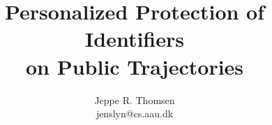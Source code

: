 \documentclass[t,mathserif]{beamer}
\title[DAT7\hspace{21em}\insertframenumber/\inserttotalframenumber]{Personalized Protection of Identifiers\\on Public Trajectories}
\author[Jeppe]{Jeppe R. Thomsen \\ \small{jenslyn@cs.aau.dk}}
\institute{Aalborg University\\ Department of Computer Science}
\begin{document}
\begin{frame} %
\titlepage
\end{frame}

%
%
%

%
%

%
%

%
%
%

\end{document}
